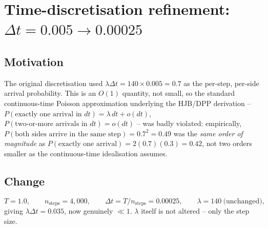 \documentclass[11pt]{article}
\begin{document}
\section{Time-discretisation refinement: $\Delta t = 0.005 \to 0.00025$}
\label{sec:discretisation}

\subsection{Motivation}
The original discretisation used $\lambda\Delta t = 140 \times 0.005 = 0.7$ as the per-step, per-side arrival probability. This is an $O(1)$ quantity, not small, so the standard continuous-time Poisson approximation underlying the HJB/DPP derivation -- $P(\text{exactly one arrival in }dt) = \lambda\, dt + o(dt)$, $P(\text{two-or-more arrivals in }dt) = o(dt)$ -- was badly violated: empirically, $P(\text{both sides arrive in the same step}) = 0.7^2 = 0.49$ was the \emph{same order of magnitude} as $P(\text{exactly one arrival}) = 2(0.7)(0.3) = 0.42$, not two orders smaller as the continuous-time idealisation assumes.

\subsection{Change}
\begin{equation}
T = 1.0, \qquad n_{\text{steps}} = 4{,}000, \qquad \Delta t = T/n_{\text{steps}} = 0.00025, \qquad \lambda = 140 \ \text{(unchanged)},
\end{equation}
giving $\lambda\Delta t = 0.035$, now genuinely $\ll 1$. $\lambda$ itself is not altered -- only the step size.
\end{document}
